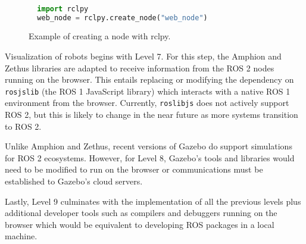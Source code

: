         \begin{figure}[htbp]
            \centering
            \begin{lstlisting}[language=Python]

  import rclpy
  web_node = rclpy.create_node("web_node")
            \end{lstlisting}
            \caption{Example of creating a node with \textsf{rclpy}.}
            \label{fig:rclpy}
        \end{figure}

        Visualization of robots begins with Level 7. For this step, the Amphion and Zethus libraries are adapted to receive information from the \ac{ROS} 2 nodes running on the browser. This entails replacing or modifying the dependency on \texttt{rosjslib} (the \ac{ROS} 1 JavaScript library) which interacts with a native \ac{ROS} 1 environment from the browser. Currently, \texttt{roslibjs} does not actively support \ac{ROS} 2, but this is likely to change in the near future as more systems transition to \ac{ROS} 2.

        Unlike Amphion and Zethus, recent versions of Gazebo do support simulations for \ac{ROS} 2 ecosystems. However, for Level 8, Gazebo's tools and libraries would need to be modified to run on the browser or communications must be established to Gazebo's cloud servers.

        Lastly, Level 9 culminates with the implementation of all the previous levels plus additional developer tools such as compilers and debuggers running on the browser which would be equivalent to developing \ac{ROS} packages in a local machine.
